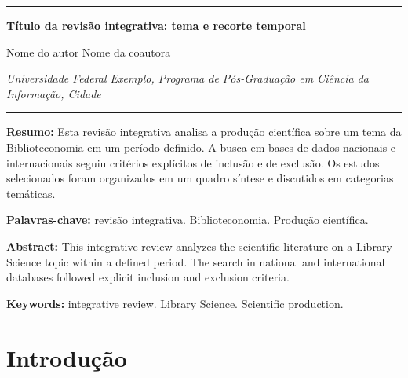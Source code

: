 \documentclass[12pt,a4paper]{article}
\newif\ifinstrucoes
\newcommand{\instrucao}[1]{\ifinstrucoes{\leavevmode\color{gray}\small\itshape #1\par}\fi}
\newcommand{\titulo}{Título da revisão integrativa: tema e recorte temporal}
\newcommand{\afiliacao}{Universidade Federal Exemplo, Programa de Pós-Graduação em Ciência da Informação, Cidade}
\begin{document}
\begin{center}
  {\color{verde}\rule{0.35\linewidth}{1.2pt}}\par\vspace{0.8em}
  {\LARGE\bfseries\titulo\par}
  \vspace{1em}
  {\large Nome do autor \qquad Nome da coautora\par}
  {\small\itshape\afiliacao\par}
  \vspace{0.6em}
  {\color{verde}\rule{0.35\linewidth}{1.2pt}}
\end{center}

\begin{singlespace}
\instrucao{Até 250 palavras com objetivo, pergunta de pesquisa, bases consultadas, período, número de estudos incluídos e principais achados.}
\noindent\textbf{Resumo:} Esta revisão integrativa analisa a produção científica sobre um tema da Biblioteconomia em um período definido. A busca em bases de dados nacionais e internacionais seguiu critérios explícitos de inclusão e de exclusão. Os estudos selecionados foram organizados em um quadro síntese e discutidos em categorias temáticas.

\smallskip
\noindent\textbf{Palavras-chave:} revisão integrativa. Biblioteconomia. Produção científica.

\medskip
\begin{otherlanguage}{english}
\noindent\textbf{Abstract:} This integrative review analyzes the scientific literature on a Library Science topic within a defined period. The search in national and international databases followed explicit inclusion and exclusion criteria.

\smallskip
\noindent\textbf{Keywords:} integrative review. Library Science. Scientific production.
\end{otherlanguage}
\end{singlespace}

\section{Introdução}
\instrucao{Apresente o tema, a lacuna que justifica a revisão e a pergunta norteadora, escrita de forma que possa ser respondida pelos estudos.}
\end{document}
